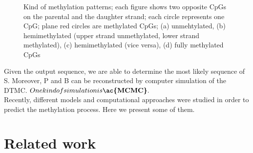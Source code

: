 \begin{figure}
\begin{subfigure}{.5\textwidth}
\centering
{}
\caption{}
\label{fig:sfig0}
\end{subfigure}%
\begin{subfigure}{.5\textwidth}
\centering
{}
  \caption{}
  \label{fig:sfig1}
\end{subfigure}
\begin{subfigure}{.5\textwidth}
\centering
{}
  \caption{}
  \label{fig:sfig2}
\end{subfigure}
\begin{subfigure}{.5\textwidth}
\centering
{}
  \caption{}
  \label{fig:sfig3}
\end{subfigure}
\caption{Kind of methylation patterns; each figure shows two opposite CpGs on the parental and the daughter strand; each circle represents one CpG; plane red circles are methylated CpGs; (a) unmehtylated, (b) hemimethylated (upper strand unmethylated, lower strand methylated), (c) hemimethylated (vice versa), (d) fully methylated CpGs}
\label{fig:fig}
\end{figure}
Given the output sequence, we are able to determine the most likely sequence of S. Moreover, P and B can be reconstructed by computer simulation of the \ac{DTMC}. $One kind of simulation is \textbf{\ac{MCMC}}.$\\

Recently, different models and computational approaches were studied in order to predict the methylation process. Here we present some of them.\\

\section{Related work} 
\label{section:RelWork} 